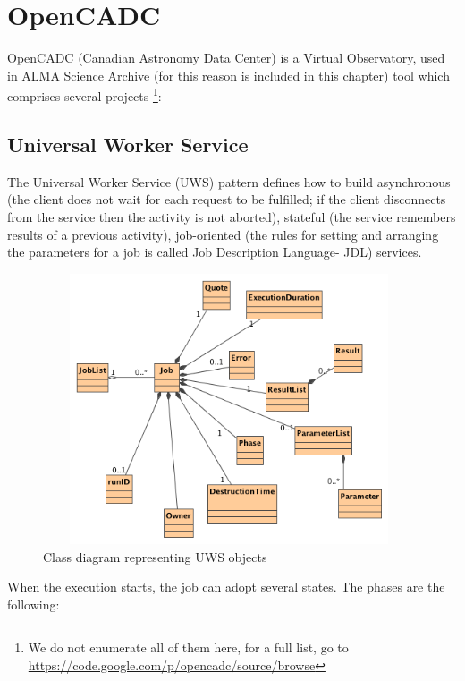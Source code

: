 \section{OpenCADC}

OpenCADC (Canadian Astronomy Data Center) is a Virtual Observatory, used in ALMA Science Archive (for this reason is included in this chapter) tool which comprises several projects \footnote{We do not enumerate all of them here, for a full list, go to \url{https://code.google.com/p/opencadc/source/browse}}:

\subsection{Universal Worker Service}

The Universal Worker Service (UWS) pattern defines how to build asynchronous (the client does not wait for each request to be fulfilled; if the client disconnects from the service then the activity is not aborted), stateful (the service remembers results of a previous activity), job-oriented (the rules for setting and arranging the parameters for a job is called Job Description Language- JDL) services.

\begin{figure}[H]
\centering
\includegraphics[width=11cm,height=8cm]{images/Class_Diagram__UWS__UWSObjects.png}
\caption{Class diagram representing UWS objects}
\end{figure}

When the execution starts, the job can adopt several states. The phases are the following:



